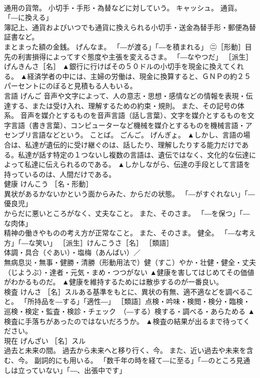 \documentclass[8pt]{extreport}
\begin{document}
\begin{CJK}{UTF8}{min}
\\	通用の貨幣。 小切手・手形・為替などに対していう。 キャッシュ。 通貨。 「―に換える」 
\\	簿記上、通貨およびいつでも通貨に換えられる小切手・送金為替手形・郵便為替証書など。 
\\	まとまった額の金銭。 げんなま。 「―が渡る」「―を積まれる」 ㊁［形動］目先の利害損得によってすぐ態度や主張を変えるさま。 「―なやつだ」 ［派生］げんきんさ［名］	▲銀行に行けばその５０ドルの小切手を現金に換えてくれる。 ▲経済学者の中には、主婦の労働は、現金に換算すると、ＧＮＰの約２５パーセントにのぼると見積もる人もいる。
\\	言語	げんご	音声や文字によって、人の意志・思想・感情などの情報を表現・伝達する、または受け入れ、理解するための約束・規則。 また、その記号の体系。 音声を媒介とするものを音声言語（話し言葉）、文字を媒介とするものを文字言語（書き言葉）、コンピューターなど機械を媒介とするものを機械言語・アセンブリ言語などという。 ことば。 ごんご。 げんぎょ。	▲しかし、言語の場合は、私達が遺伝的に受け継ぐのは、話したり、理解したりする能力だけである。私達が話す特定の１つないし複数の言語は、遺伝ではなく、文化的な伝達によって私達に伝えられるのである。 ▲しかしながら、伝達の手段として言語を持っているのは、人間だけである。
\\	健康	けんこう	［名・形動］ 
\\	異状があるかないかという面からみた、からだの状態。 「―がすぐれない」「―優良児」 
\\	からだに悪いところがなく、丈夫なこと。 また、そのさま。 「―を保つ」「―な肉体」 
\\	精神の働きやものの考え方が正常なこと。 また、そのさま。 健全。 「―な考え方」「―な笑い」 ［派生］けんこうさ［名］ ［類語］
\\	体調・具合（ぐあい）・塩梅（あんばい）／
\\	無病息災・無事・健勝・清勝（形動用法で）健（すこ）やか・壮健・健全・丈夫（じようぶ）・達者・元気・まめ・つつがない	▲健康を害してはじめてその価値がわかるものだ。 ▲健康を維持するためには散歩するのが一番良い。
\\	検査	けんさ	［名］スルある基準をもとに、異状の有無、適不適などを調べること。 「所持品を―する」「適性―」 ［類語］点検・吟味・検閲・検分・臨検・巡検・検定・監査・検診・チェック　（―する）検する・調べる・あらためる	▲検査に手落ちがあったのではないだろうか。 ▲検査の結果が出るまで待ってください。
\\	現在	げんざい	［名］スル 
\\	過去と未来の間。 過去から未来へと移り行く、今。 また、近い過去や未来を含む、今。 副詞的にも用いる。 「数千年の時を経て―に至る」「―のところ見通しは立っていない」「―、出張中です」 

\end{CJK}
\end{document}

